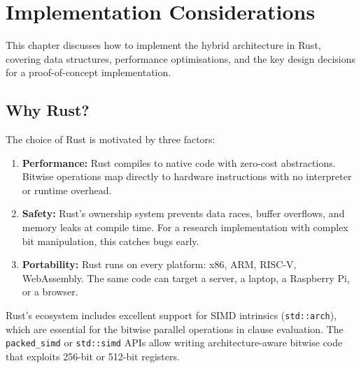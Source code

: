 \chapter{Implementation Considerations}
\label{ch:implementation}

This chapter discusses how to implement the hybrid architecture in
Rust, covering data structures, performance optimisations, and the
key design decisions for a proof-of-concept implementation.


\section{Why Rust?}
\label{sec:why-rust}

The choice of Rust is motivated by three factors:

\begin{enumerate}
  \item \textbf{Performance:} Rust compiles to native code with
    zero-cost abstractions. Bitwise operations map directly to
    hardware instructions with no interpreter or runtime overhead.

  \item \textbf{Safety:} Rust's ownership system prevents data races,
    buffer overflows, and memory leaks at compile time. For a
    research implementation with complex bit manipulation, this
    catches bugs early.

  \item \textbf{Portability:} Rust runs on every platform: x86,
    ARM, RISC-V, WebAssembly. The same code can target a server,
    a laptop, a Raspberry Pi, or a browser.
\end{enumerate}

\begin{engineernote}
Rust's ecosystem includes excellent support for SIMD intrinsics
(\texttt{std::arch}), which are essential for the bitwise parallel
operations in clause evaluation. The \texttt{packed\_simd} or
\texttt{std::simd} APIs allow writing architecture-aware bitwise
code that exploits 256-bit or 512-bit registers.
\end{engineernote}


